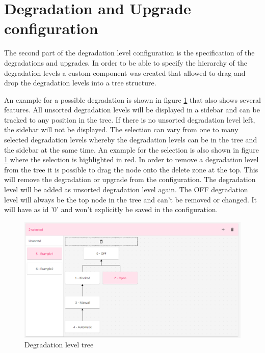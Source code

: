 \section{Degradation and Upgrade configuration}
\label{sec:deg_and_upg}

The second part of the degradation level configuration is the specification of the degradations and upgrades. In order to be able to specify the hierarchy of the degradation levels a custom component was created that allowed to drag and drop the degradation levels into a tree structure.

An example for a possible degradation is shown in figure \ref{fig:degradation_level_tree} that also shows several features. All unsorted degradation levels will be displayed in a sidebar and can be tracked to any position in the tree. If there is no unsorted degradation level left, the sidebar will not be displayed. The selection can vary from one to many selected degradation levels whereby the degradation levels can be in the tree and the sidebar at the same time. An example for the selection is also shown in figure \ref{fig:degradation_level_tree} where the selection is highlighted in red. In order to remove a degradation level from the tree it is possible to drag the node onto the delete zone at the top. This will remove the degradation or upgrade from the configuration. The degradation level will be added as unsorted degradation level again. The OFF degradation level will always be the top node in the tree and can't be removed or changed. It will have as id '0' and won't explicitly be saved in the configuration.

\begin{figure}[ht]
    \centering
    \includegraphics[width=\textwidth]{img/degradation_tree.png}
    \caption{Degradation level tree}
    \label{fig:degradation_level_tree}
\end{figure}

